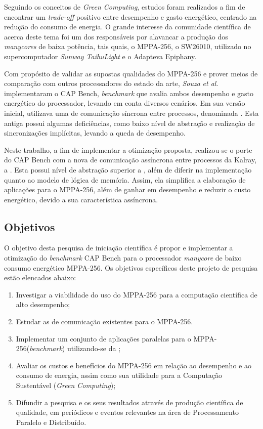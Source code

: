 \documentclass[a4paper,11pt]{article}
\newcommand{\etal}{\textit{et al}.\xspace}
\newcommand{\mppa}{MPPA-256\xspace}
\newcommand{\capb}{CAP Bench\xspace}
\newcommand{\epiphany}{Adapteva Epiphany\xspace}
\newcommand{\manycore}{\textit{manycore}\xspace}
\newcommand{\manycores}{\textit{manycores}\xspace}
\newcommand{\bench}{\textit{benchmark}\xspace}
\begin{document}
Seguindo os conceitos de \textit{Green Computing}, estudos foram realizados a fim de encontrar um \textit{trade-off} positivo entre desempenho e gasto energético, centrado na redução do consumo de energia. O grande interesse da comunidade científica de \hpc acerca deste tema foi um dos responsáveis por alavancar a produção dos \manycores de baixa potência, tais quais, o \mppa \cite{MPPA-2:2013}, o SW26010, utilizado no supercomputador \textit{Sunway TaihuLight} \cite{sunway:2016} e o \epiphany  \cite{Olofsson2014}.

Com propósito de validar as supostas qualidades do \mppa e prover meios de comparação com outros processadores do estado da arte, \textit{Souza} \etal implementaram o \capb \cite{Castro-Souza-CCPE:2016}, \textit{benchmark} que avalia ambos desempenho e gasto energético do processador, levando em conta diversos cenários. Em sua versão inicial, utilizava uma \api de comunicação síncrona entre processos, denominada \ipc \cite{MPPA-2:2013}. Esta antiga \api possui algumas deficiências, como baixo nível de abstração e realização de sincronizações implícitas, levando a queda de desempenho.

Neste trabalho, a fim de implementar a otimização proposta, realizou-se o porte do \capb com a nova \api de comunicação assíncrona entre processos da Kalray, a \async \cite{Hascoet2017}. Esta \api possui nível de abstração superior a \ipc, além de diferir na implementação quanto ao modelo de lógica de memória. Assim, ela simplifica a elaboração de aplicações para o \mppa, além de ganhar em desempenho e reduzir o custo energético, devido a sua característica assíncrona.

\subsection{Objetivos}

O objetivo desta pesquisa de iniciação científica é propor e implementar a otimização do \bench \capb para o processador \manycore de baixo consumo energético \mppa. Os objetivos específicos deste projeto de pesquisa estão elencados abaixo:

\begin{enumerate}
	\setlength\itemsep{0em}
	\item Investigar a viabilidade do uso do \mppa para a computação científica de alto desempenho;
	\item Estudar as \apis de comunicação existentes para o \mppa.
	\item Implementar um conjunto de aplicações paralelas para o \mppa (\bench) utilizando-se da \api \async;
	\item Avaliar os custos e benefícios do \mppa em relação ao desempenho e ao consumo de energia, assim como sua utilidade para a Computação Sustentável (\textit{Green Computing});
	\item Difundir a pesquisa e os seus resultados através de produção científica de qualidade, em periódicos e eventos relevantes na área de Processamento Paralelo e Distribuído.
\end{enumerate}
\end{document}
